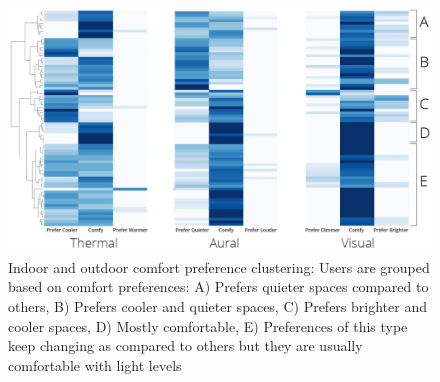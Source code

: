 

  


\begin{figure}
\begin{center}
\includegraphics[width=\textwidth, trim= 0cm 0cm 0cm 0cm,clip]{Images/Fig3.jpg}
\caption{Indoor and outdoor comfort preference clustering: Users are grouped based on comfort preferences: A) Prefers quieter spaces compared to others, B) Prefers cooler and quieter spaces, C) Prefers brighter and cooler spaces, D) Mostly comfortable, E) Preferences of this type keep changing as compared to others but they are usually comfortable with light levels}
\label{fig:clustering}
\end{center}
\end{figure}

